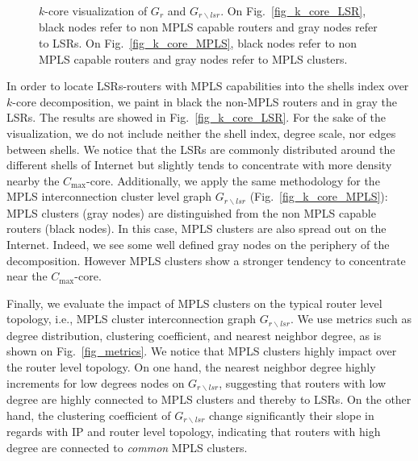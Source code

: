 \begin{figure*}[!t]
  \begin{center}
\hfil
  \end{center}
  \caption{$k$-core visualization of $G_r$ and $G_{r \backslash lsr}$.  On
  Fig.~\ref{fig_k_core_LSR}, black nodes refer to non MPLS capable routers and
  gray nodes refer to LSRs.  On Fig.~\ref{fig_k_core_MPLS}, black nodes refer to
  non MPLS capable routers and gray nodes refer to MPLS clusters.} 
  \label{fig_kcore_overview}
\end{figure*}

In order to locate LSRs-routers with MPLS capabilities into the shells index
over $k$-core decomposition, we paint in black the non-MPLS routers and in gray
the LSRs. The results are showed in Fig.~\ref{fig_k_core_LSR}.  For the sake of
the visualization, we do not include neither the shell index, degree scale, nor
edges between shells. We notice that the LSRs are commonly distributed around
the different shells of Internet but slightly tends to concentrate with more
density nearby the $C_{\max}$-core. Additionally, we apply the same methodology
for the MPLS interconnection cluster level graph $G_{r\backslash lsr}$
(Fig.~\ref{fig_k_core_MPLS}): MPLS clusters (gray nodes) are distinguished from
the non MPLS capable routers (black nodes). In this case,  MPLS clusters  are
also spread out on the Internet.  Indeed, we see some well defined gray nodes on
the periphery of the decomposition. However MPLS clusters show a stronger
tendency to concentrate near the $C_{\max}$-core.

Finally, we evaluate the impact of MPLS clusters on the typical router level
topology, i.e., MPLS cluster interconnection graph $G_{r \backslash lsr }$. We
use metrics such as degree distribution, clustering coefficient, and nearest
neighbor degree, as is shown on Fig.~\ref{fig_metrics}.
We notice that MPLS clusters highly impact over the router level topology. On
one hand, the nearest neighbor degree highly increments for low degrees nodes on
$G_{r \backslash lsr }$, suggesting that routers with low degree are highly
connected to MPLS clusters and thereby to LSRs. On the other hand, the
clustering coefficient of $G_{r \backslash lsr }$ change significantly their
slope in regards with IP and router level topology, indicating that routers with
high degree are connected to \textit{common} MPLS clusters. 


